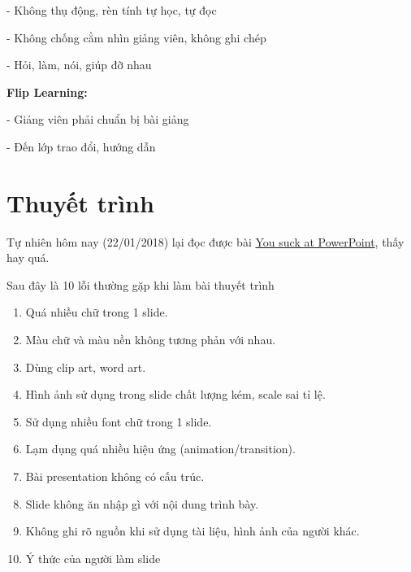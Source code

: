 - Không thụ động, rèn tính tự học, tự đọc

- Không chống cằm nhìn giảng viên, không ghi chép

- Hỏi, làm, nói, giúp đỡ nhau

\textbf{Flip Learning:}

- Giảng viên phải chuẩn bị bài giảng

- Đến lớp trao đổi, hướng dẫn

\section{Thuyết trình}

Tự nhiên hôm nay (22/01/2018) lại đọc được bài \href{https://huynq.net/you-suck-at-powerpoint/}{You suck at PowerPoint}, thấy hay quá.

Sau đây là 10 lỗi thường gặp khi làm bài thuyết trình

\begin{enumerate}
  \item Quá nhiều chữ trong 1 slide.
  \item Màu chữ và màu nền không tương phản với nhau.
  \item Dùng clip art, word art.
  \item Hình ảnh sử dụng trong slide chất lượng kém, scale sai tỉ lệ.
  \item Sử dụng nhiều font chữ trong 1 slide.
  \item Lạm dụng quá nhiều hiệu ứng (animation/transition).
  \item Bài presentation không có cấu trúc.
  \item Slide không ăn nhập gì với nội dung trình bày.
  \item Không ghi rõ nguồn khi sử dụng tài liệu, hình ảnh của người khác.
  \item Ý thức của người làm slide
\end{enumerate}
